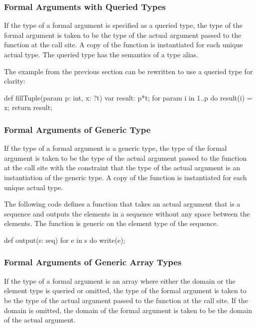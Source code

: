 \subsubsection{Formal Arguments with Queried Types}
\label{Formal_Arguments_with_Queried_Types}

If the type of a formal argument is specified as a queried type, the
type of the formal argument is taken to be the type of the actual
argument passed to the function at the call site.  A copy of the
function is instantiated for each unique actual type.  The queried
type has the semantics of a type alias.
\begin{example}
The example from the previous section can be rewritten to use a
queried type for clarity:
\begin{chapel}
def fillTuple(param p: int, x: ?t) {
  var result: p*t;
  for param i in 1..p do
    result(i) = x;
  return result;
}
\end{chapel}
\end{example}

\subsubsection{Formal Arguments of Generic Type}
\label{Formal_Arguments_of_Generic_Type}

If the type of a formal argument is a generic type, the type of the
formal argument is taken to be the type of the actual argument passed
to the function at the call site with the constraint that the type of
the actual argument is an instantiation of the generic type.  A copy
of the function is instantiated for each unique actual type.
\begin{example}
The following code defines a function that takes an actual argument
that is a sequence and outputs the elements in a sequence without any
space between the elements.  The function is generic on the element
type of the sequence.
\begin{chapel}
def output(s: seq) {
  for e in s do
    write(e);
}
\end{chapel}
\end{example}

\subsubsection{Formal Arguments of Generic Array Types}
\label{Formal_Arguments_of_Generic_Array_Types}

If the type of a formal argument is an array where either the domain
or the element type is queried or omitted, the type of the formal
argument is taken to be the type of the actual argument passed to the
function at the call site.  If the domain is omitted, the domain of
the formal argument is taken to be the domain of the actual argument.

